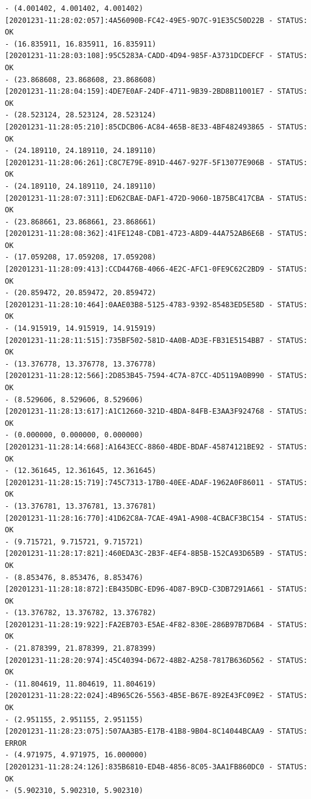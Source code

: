 \documentclass[11pt, oneside]{article}   	%
\begin{document}
\begin{Verbatim}[frame=topline,
			framesep=4mm,
			label=\fbox{\Large{STATUS\_20201231.log}}]
- (4.001402, 4.001402, 4.001402)
[20201231-11:28:02:057]:4A56090B-FC42-49E5-9D7C-91E35C50D22B - STATUS: OK        
- (16.835911, 16.835911, 16.835911)
[20201231-11:28:03:108]:95C5283A-CADD-4D94-985F-A3731DCDEFCF - STATUS: OK        
- (23.868608, 23.868608, 23.868608)
[20201231-11:28:04:159]:4DE7E0AF-24DF-4711-9B39-2BD8B11001E7 - STATUS: OK        
- (28.523124, 28.523124, 28.523124)
[20201231-11:28:05:210]:85CDCB06-AC84-465B-8E33-4BF482493865 - STATUS: OK        
- (24.189110, 24.189110, 24.189110)
[20201231-11:28:06:261]:C8C7E79E-891D-4467-927F-5F13077E906B - STATUS: OK        
- (24.189110, 24.189110, 24.189110)
[20201231-11:28:07:311]:ED62CBAE-DAF1-472D-9060-1B75BC417CBA - STATUS: OK        
- (23.868661, 23.868661, 23.868661)
[20201231-11:28:08:362]:41FE1248-CDB1-4723-A8D9-44A752AB6E6B - STATUS: OK        
- (17.059208, 17.059208, 17.059208)
[20201231-11:28:09:413]:CCD4476B-4066-4E2C-AFC1-0FE9C62C2BD9 - STATUS: OK        
- (20.859472, 20.859472, 20.859472)
[20201231-11:28:10:464]:0AAE03B8-5125-4783-9392-85483ED5E58D - STATUS: OK        
- (14.915919, 14.915919, 14.915919)
[20201231-11:28:11:515]:735BF502-581D-4A0B-AD3E-FB31E5154BB7 - STATUS: OK        
- (13.376778, 13.376778, 13.376778)
[20201231-11:28:12:566]:2D853B45-7594-4C7A-87CC-4D5119A0B990 - STATUS: OK        
- (8.529606, 8.529606, 8.529606)
[20201231-11:28:13:617]:A1C12660-321D-4BDA-84FB-E3AA3F924768 - STATUS: OK        
- (0.000000, 0.000000, 0.000000)
[20201231-11:28:14:668]:A1643ECC-8860-4BDE-BDAF-45874121BE92 - STATUS: OK        
- (12.361645, 12.361645, 12.361645)
[20201231-11:28:15:719]:745C7313-17B0-40EE-ADAF-1962A0F86011 - STATUS: OK        
- (13.376781, 13.376781, 13.376781)
[20201231-11:28:16:770]:41D62C8A-7CAE-49A1-A908-4CBACF3BC154 - STATUS: OK        
- (9.715721, 9.715721, 9.715721)
[20201231-11:28:17:821]:460EDA3C-2B3F-4EF4-8B5B-152CA93D65B9 - STATUS: OK        
- (8.853476, 8.853476, 8.853476)
[20201231-11:28:18:872]:EB435DBC-ED96-4D87-B9CD-C3DB7291A661 - STATUS: OK        
- (13.376782, 13.376782, 13.376782)
[20201231-11:28:19:922]:FA2EB703-E5AE-4F82-830E-286B97B7D6B4 - STATUS: OK        
- (21.878399, 21.878399, 21.878399)
[20201231-11:28:20:974]:45C40394-D672-48B2-A258-7817B636D562 - STATUS: OK        
- (11.804619, 11.804619, 11.804619)
[20201231-11:28:22:024]:4B965C26-5563-4B5E-B67E-892E43FC09E2 - STATUS: OK        
- (2.951155, 2.951155, 2.951155)
[20201231-11:28:23:075]:507AA3B5-E17B-41B8-9B04-8C14044BCAA9 - STATUS: ERROR     
- (4.971975, 4.971975, 16.000000)
[20201231-11:28:24:126]:835B6810-ED4B-4856-8C05-3AA1FB860DC0 - STATUS: OK        
- (5.902310, 5.902310, 5.902310)

\end{Verbatim}
\end{document}
